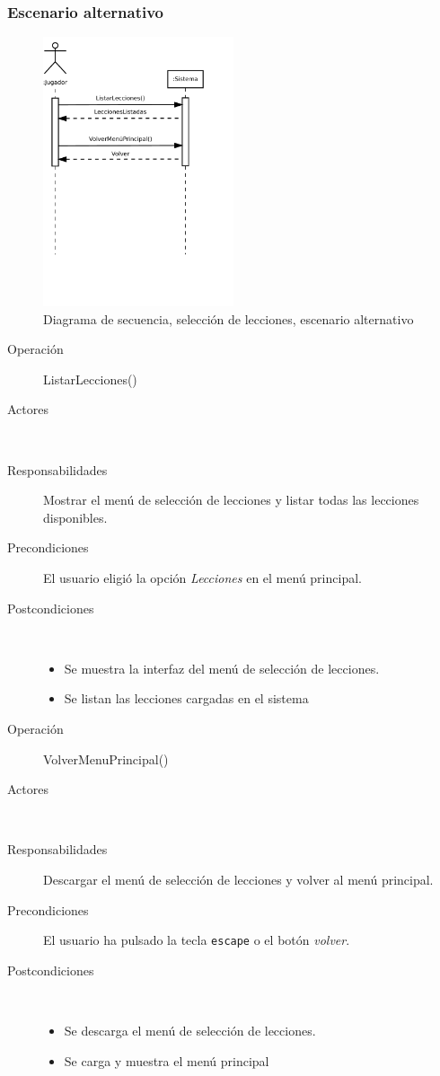 \subsubsection{Escenario alternativo}
\begin{figure}[h!]
  \centering
  \includegraphics[trim=0cm 12cm 0cm 0cm, clip=true, width=0.5\textwidth]{4_analisis/diagsec_caso7_esc2}
  \caption{Diagrama de secuencia, selección de lecciones, escenario alternativo}
\end{figure}

\begin{description}
\item[Operación] ListarLecciones()
\item[Actores] \jugador\, \sistema\
\item[Responsabilidades] Mostrar el menú de selección de lecciones y listar
  todas las lecciones disponibles.
\item[Precondiciones] El usuario eligió la opción \textit{Lecciones} en el menú
  principal.
\item[Postcondiciones] $\quad$
  \begin{itemize}
  \item Se muestra la interfaz del menú de selección de lecciones.
  \item Se listan las lecciones cargadas en el sistema
  \end{itemize}
\end{description}

\begin{description}
\item[Operación] VolverMenuPrincipal()
\item[Actores] \jugador\, \sistema\
\item[Responsabilidades] Descargar el menú de selección de lecciones y volver al
  menú principal.
\item[Precondiciones] El usuario ha pulsado la tecla \texttt{escape} o el botón \textit{volver}.
\item[Postcondiciones] $\quad$
  \begin{itemize}
  \item Se descarga el menú de selección de lecciones.
  \item Se carga y muestra el menú principal
  \end{itemize}
\end{description}

